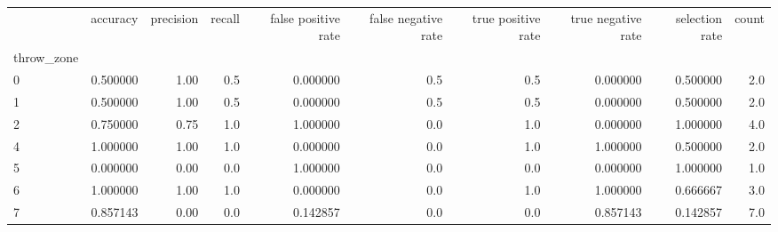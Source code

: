 \begin{tabular}{lrrrrrrrrr}
\toprule
{} &  accuracy &  precision &  recall &  false positive rate &  false negative rate &  true positive rate &  true negative rate &  selection rate &  count \\
throw\_zone &           &            &         &                      &                      &                     &                     &                 &        \\
\midrule
0          &  0.500000 &       1.00 &     0.5 &             0.000000 &                  0.5 &                 0.5 &            0.000000 &        0.500000 &    2.0 \\
1          &  0.500000 &       1.00 &     0.5 &             0.000000 &                  0.5 &                 0.5 &            0.000000 &        0.500000 &    2.0 \\
2          &  0.750000 &       0.75 &     1.0 &             1.000000 &                  0.0 &                 1.0 &            0.000000 &        1.000000 &    4.0 \\
4          &  1.000000 &       1.00 &     1.0 &             0.000000 &                  0.0 &                 1.0 &            1.000000 &        0.500000 &    2.0 \\
5          &  0.000000 &       0.00 &     0.0 &             1.000000 &                  0.0 &                 0.0 &            0.000000 &        1.000000 &    1.0 \\
6          &  1.000000 &       1.00 &     1.0 &             0.000000 &                  0.0 &                 1.0 &            1.000000 &        0.666667 &    3.0 \\
7          &  0.857143 &       0.00 &     0.0 &             0.142857 &                  0.0 &                 0.0 &            0.857143 &        0.142857 &    7.0 \\
\bottomrule
\end{tabular}
